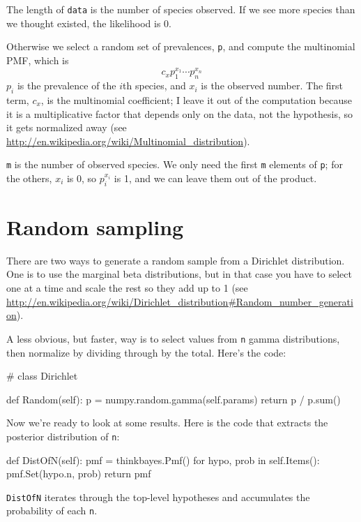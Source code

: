 \documentclass[12pt]{book}
\theoremstyle{exercise}
\newcommand{\py}[1]{{\tt #1}}%
\begin{document}
The length of \py{data} is the number of species observed.  If
we see more species than we thought existed, the likelihood is 0.

Otherwise we select a random set of prevalences, \py{p}, and
compute the multinomial PMF, which is
%
\[ c_x  p_1^{x_1} \cdots p_n^{x_n} \]
%
$p_i$ is the prevalence of the $i$th species, and $x_i$ is the
observed number.  The first term, $c_x$, is the multinomial
coefficient; I leave it out of the computation because it is
a multiplicative factor that depends only
on the data, not the hypothesis, so it gets normalized away
(see \url{http://en.wikipedia.org/wiki/Multinomial_distribution}).

\py{m} is the number of observed species.
We only need the first \py{m} elements of \py{p};
for the others, $x_i$ is 0, so
$p_i^{x_i}$ is 1, and we can leave them out of the product.


\section{Random sampling}
\label{randomdir}

There are two ways to generate a random sample from a Dirichlet
distribution.  One is to use the marginal beta distributions, but in
that case you have to select one at a time and scale the rest so they
add up to 1 (see
\url{http://en.wikipedia.org/wiki/Dirichlet_distribution#Random_number_generation}).

A less obvious, but faster, way is to select values from \py{n} gamma
distributions, then normalize by dividing through by the total.
Here's the code:

\begin{code}
# class Dirichlet

    def Random(self):
        p = numpy.random.gamma(self.params)
        return p / p.sum()
\end{code}

Now we're ready to look at some results.  Here is the code that extracts
the posterior distribution of \py{n}:

\begin{code}
    def DistOfN(self):
        pmf = thinkbayes.Pmf()
        for hypo, prob in self.Items():
            pmf.Set(hypo.n, prob)
        return pmf
\end{code}

\py{DistOfN} iterates
through the top-level hypotheses and accumulates the probability
of each \py{n}.
\end{document}
